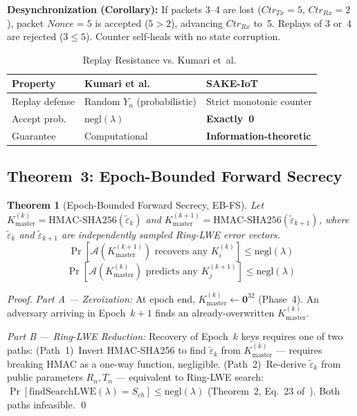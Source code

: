 \documentclass[conference]{IEEEtran}
\newtheorem{theorem}{Theorem}
\newcommand{\Kmaster}{K_{\mathrm{master}}}
\begin{document}
\noindent\textbf{Desynchronization (Corollary):} If packets 3--4 are lost
($\mathit{Ctr}_{Tx}=5$, $\mathit{Ctr}_{Rx}=2$), packet $\mathit{Nonce}=5$
is accepted ($5 > 2$), advancing $\mathit{Ctr}_{Rx}$ to~5. Replays of
3 or~4 are rejected ($3 \leq 5$). Counter self-heals with no state corruption.

\begin{table}[!t]
\centering
\small
\caption{Replay Resistance vs. Kumari et~al.~\cite{kumari2022}}
\label{tab:replaycompare}
\renewcommand{\arraystretch}{1.1}
\begin{tabular}{p{1.8cm}p{2.5cm}p{2.5cm}}
\toprule
\textbf{Property} & \textbf{Kumari et al.} & \textbf{SAKE-IoT} \\
\midrule
Replay defense & Random $Y_n$ (probabilistic) & Strict monotonic counter \\
Accept prob. & $\mathrm{negl}(\lambda)$ & \textbf{Exactly~0} \\
Guarantee & Computational & \textbf{Information-theoretic} \\
\bottomrule
\end{tabular}
\end{table}

\subsection{Theorem~3: Epoch-Bounded Forward Secrecy}

\begin{theorem}[Epoch-Bounded Forward Secrecy, EB-FS]
\label{thm:ebfs}
Let $\Kmaster^{(k)} = \mathrm{HMAC\text{-}SHA256}(\tilde{\varepsilon}_k)$
and $\Kmaster^{(k+1)} = \mathrm{HMAC\text{-}SHA256}(\tilde{\varepsilon}_{k+1})$,
where $\tilde{\varepsilon}_k$ and $\tilde{\varepsilon}_{k+1}$ are independently
sampled Ring-LWE error vectors.
\begin{equation}
\Pr[\mathcal{A}(\Kmaster^{(k+1)}) \text{ recovers any } K_i^{(k)}] \leq \mathrm{negl}(\lambda)
\end{equation}
\begin{equation}
\Pr[\mathcal{A}(\Kmaster^{(k)}) \text{ predicts any } K_j^{(k+1)}] \leq \mathrm{negl}(\lambda)
\end{equation}
\end{theorem}

\begin{proof}
\textit{Part A --- Zeroization:} At epoch end,
$\Kmaster^{(k)} \leftarrow \mathbf{0}^{32}$ (Phase~4). An adversary
arriving in Epoch~$k{+}1$ finds an already-overwritten $\Kmaster^{(k)}$.

\textit{Part B --- Ring-LWE Reduction:} Recovery of Epoch~$k$ keys
requires one of two paths: (Path~1)~Invert HMAC-SHA256 to find
$\tilde{\varepsilon}_k$ from $\Kmaster^{(k)}$ --- requires breaking
HMAC as a one-way function, negligible. (Path~2)~Re-derive
$\tilde{\varepsilon}_k$ from public parameters $R_n, T_n$ ---
equivalent to Ring-LWE search:
$\Pr[\mathrm{findSearchLWE}(\lambda) = S_{ch}] \leq \mathrm{negl}(\lambda)$
(Theorem~2, Eq.~23 of~\cite{kumari2022}). Both paths infeasible. \qed
\end{proof}
\end{document}
